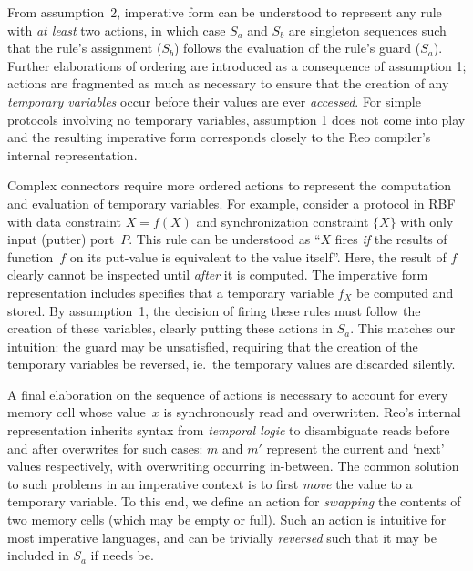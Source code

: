 From assumption~2, imperative form can be understood to represent any rule with \textit{at least} two actions, in which case $S_a$ and $S_b$ are singleton sequences such that the rule's assignment ($S_b$) follows the evaluation of the rule's guard ($S_a$). Further elaborations of ordering are introduced as a consequence of assumption 1; actions are fragmented as much as necessary to ensure that the creation of any \textit{temporary variables} occur before their values are ever \textit{accessed}. For simple protocols involving no temporary variables, assumption 1 does not come into play and the resulting imperative form corresponds closely to the Reo compiler's internal representation.

Complex connectors require more ordered actions to represent the computation and evaluation of temporary variables. For example, consider a protocol in RBF with data constraint $X=f(X)$ and synchronization constraint $\{X\}$ with only input (putter) port~$P$. This rule can be understood as ``$X$ fires \textit{if} the results of function~$f$ on its put-value is equivalent to the value itself''. Here, the result of $f$ clearly cannot be inspected until \textit{after} it is computed. The imperative form representation includes specifies that a temporary variable $f_X$ be computed and stored. By assumption~1, the decision of firing these rules must follow the creation of these variables, clearly putting these actions in $S_a$. This matches our intuition: the guard may be unsatisfied, requiring that the creation of the temporary variables be reversed, ie.\ the temporary values are discarded silently.

A final elaboration on the sequence of actions is necessary to account for every memory cell whose value~$x$ is synchronously read and overwritten. Reo's internal representation inherits syntax from \textit{temporal logic} to disambiguate reads before and after overwrites for such cases: $m$ and $m'$ represent the current and `next' values respectively, with overwriting occurring in-between. The common solution to such problems in an imperative context is to first \textit{move} the value to a temporary variable. To this end, we define an action for \textit{swapping} the contents of two memory cells (which may be empty or full). Such an action is intuitive for most imperative languages, and can be trivially \textit{reversed} such that it may be included in $S_a$ if needs be.

